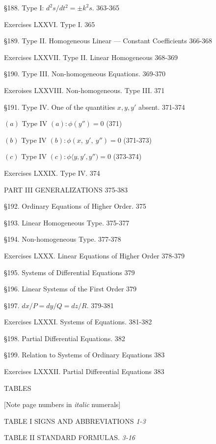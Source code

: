 \documentclass[12pt]{article}
\begin{document}
\S 188. Type I: $d^{2}s/dt^{2}=\pm k^{2}s$. 363-365

Exercises LXXVI. Type I. 365

\S 189. Type II. Homogeneous Linear --- Constant Coefficients 366-368

Exercises LXXVII. Type II. Linear Homogeneous 368-369

\S 190. Type III. Non-homogeneous Equations. 369-370

Exeroises LXXVIII. Non-homogeneous. Type III. 371

\S 191. Type IV. One of the quantities $x, y, y'$ absent. 371-374
\begin{center}
$(a)$ Type IV $(a):\phi(y'')=0$ (371)

$(b)$ Type IV $(b):\phi(x,\ y',\ y'')=0$ (371-373)

$(c)$ Type IV $(c):\phi\langle y, y', y'')=0$ (373-374)
\end{center}

Exercises LXXIX. Type IV. 374

\begin{center}
PART III GENERALIZATIONS 375-383
\end{center}

\S 192. Ordinary Equations of Higher Order. 375

\S 193. Linear Homogeneous Type. 375-377

\S 194. Non-homogeneous Type. 377-378

Exercises LXXX. Linear Equations of Higher Order 378-379

\S 195. Systems of Differential Equations 379

\S 196. Linear Systems of the First Order 379

\S 197. $dx/P=dy/Q=dz/R$. 379-381

Exercises LXXXI. Systems of Equations. 381-382

\S 198. Partial Differential Equations. 382

\S 199. Relation to Systems of Ordinary Equations 383

Exercises LXXXII. Partial Differential Equations 383

\begin{center}
TABLES

[Note page numbers in {\it italic} numerals]

TABLE I SIGNS AND ABBREVIATIONS {\it 1-3}

TABLE II STANDARD FORMULAS. {\it 3-16}
\end{center}
\end{document}
